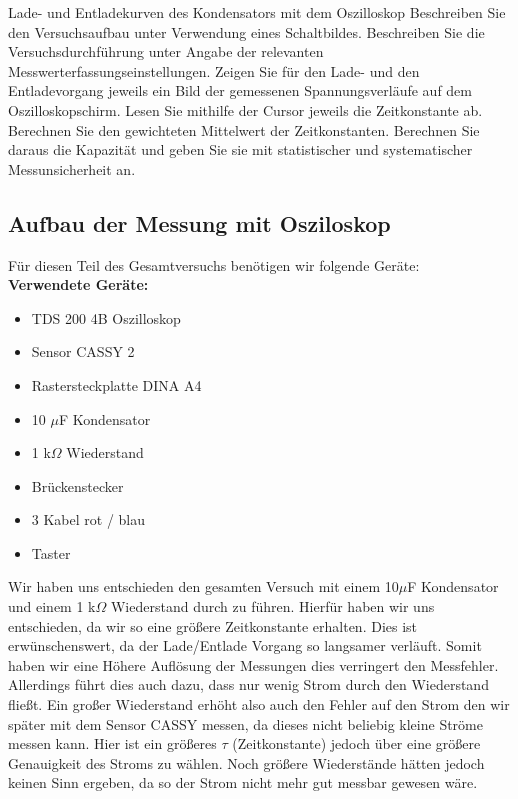 \documentclass[twoside]{protokoll}
\begin{document}
\begin{aufgabe}{Lade- und Entladekurven des Kondensators mit dem Oszilloskop}
  Beschreiben Sie den Versuchsaufbau unter Verwendung eines
  Schaltbildes. Beschreiben Sie die Versuchsdurchführung unter Angabe
  der relevanten Messwerterfassungseinstellungen. Zeigen Sie für den
  Lade- und den Entladevorgang jeweils ein Bild der gemessenen
  Spannungsverläufe auf dem Oszilloskopschirm. Lesen Sie mithilfe der
  Cursor jeweils die Zeitkonstante ab. Berechnen Sie den gewichteten
  Mittelwert der Zeitkonstanten. Berechnen Sie daraus die Kapazität
  und geben Sie sie mit statistischer und systematischer
  Messunsicherheit an.
  
\subsection{Aufbau der Messung mit Osziloskop}  
   
  Für diesen Teil des Gesamtversuchs benötigen wir folgende Geräte:\\
  
  \textbf{Verwendete Geräte:}
  \begin{itemize}
  	\item TDS 200 4B Oszilloskop
  	\item Sensor CASSY 2
  	\item Rastersteckplatte DINA A4
  	\item 10 $\mu$F Kondensator
  	\item 1 k$\Omega$ Wiederstand
  	\item Brückenstecker
  	\item 3 Kabel rot / blau
  	\item Taster
  \end{itemize}   

  Wir haben uns entschieden den gesamten Versuch mit einem 10$\mu$F Kondensator und einem 
  1 k$\Omega$ Wiederstand durch zu führen. Hierfür haben wir uns entschieden, da wir so
  eine größere Zeitkonstante erhalten. Dies ist erwünschenswert, da der 
  Lade/Entlade Vorgang so langsamer verläuft. Somit haben wir eine Höhere Auflösung 
  der Messungen dies verringert den Messfehler. Allerdings führt dies auch dazu, dass nur wenig
  Strom durch den Wiederstand fließt. Ein großer Wiederstand erhöht also auch den Fehler auf 
  den Strom den wir später mit dem Sensor CASSY messen, da dieses nicht beliebig kleine 
  Ströme messen kann. Hier ist ein größeres $\tau$ (Zeitkonstante) jedoch über eine größere
  Genauigkeit des Stroms zu wählen. Noch größere Wiederstände hätten jedoch keinen Sinn ergeben, 
  da so der Strom nicht mehr gut messbar gewesen wäre.
  

\end{aufgabe}
\end{document}
